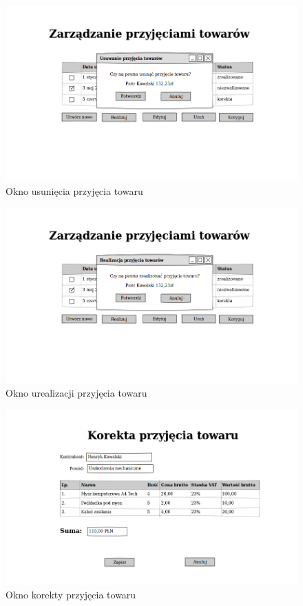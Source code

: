 \begin{figure}[!htb]
  \begin{center}
    \includegraphics[scale=0.45]{../img/interfejs/usuniecie-przyjecia-towaru.png}
  \end{center}
  \caption{Okno usunięcia przyjęcia towaru}
\end{figure}
\FloatBarrier

\begin{figure}[!htb]
  \begin{center}
    \includegraphics[scale=0.45]{../img/interfejs/realizacja-przyjecia-towaru.png}
  \end{center}
  \caption{Okno urealizacji przyjęcia towaru}
\end{figure}
\FloatBarrier

\begin{figure}[!htb]
  \begin{center}
    \includegraphics[scale=0.45]{../img/interfejs/korekta-przyjecia-towaru.png}
  \end{center}
  \caption{Okno korekty przyjęcia towaru}
\end{figure}
\FloatBarrier